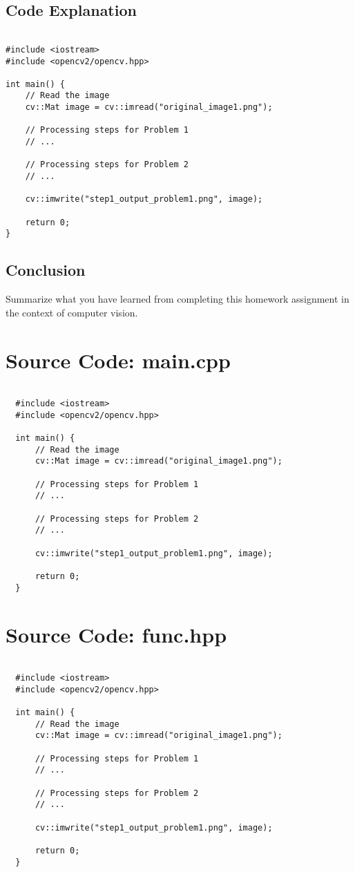 \documentclass[12pt,a4paper]{report}
\begin{document}
\section{Code Explanation}

\begin{lstlisting}

#include <iostream>
#include <opencv2/opencv.hpp>

int main() {
    // Read the image
    cv::Mat image = cv::imread("original_image1.png");

    // Processing steps for Problem 1
    // ...

    // Processing steps for Problem 2
    // ...

    cv::imwrite("step1_output_problem1.png", image);

    return 0;
}
\end{lstlisting}

\section{Conclusion}
Summarize what you have learned from completing this homework assignment in the context of computer vision.

\appendix

\chapter{Source Code: main.cpp}
\begin{lstlisting}
  
  #include <iostream>
  #include <opencv2/opencv.hpp>
  
  int main() {
      // Read the image
      cv::Mat image = cv::imread("original_image1.png");
  
      // Processing steps for Problem 1
      // ...
  
      // Processing steps for Problem 2
      // ...
  
      cv::imwrite("step1_output_problem1.png", image);
  
      return 0;
  }
  \end{lstlisting}
\chapter{Source Code: func.hpp}
\begin{lstlisting}
  
  #include <iostream>
  #include <opencv2/opencv.hpp>
  
  int main() {
      // Read the image
      cv::Mat image = cv::imread("original_image1.png");
  
      // Processing steps for Problem 1
      // ...
  
      // Processing steps for Problem 2
      // ...
  
      cv::imwrite("step1_output_problem1.png", image);
  
      return 0;
  }
  \end{lstlisting}
\end{document}
